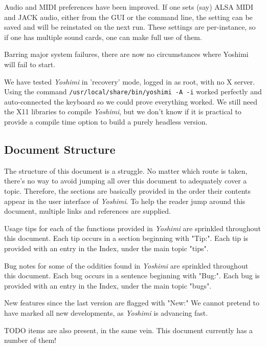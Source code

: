 \documentclass[
 11pt,
 twoside,
 a4paper,
 final                                 %
]{article}
\begin{document}
   Audio and MIDI preferences have been improved. If one sets (say) ALSA MIDI
   and JACK audio, either from the GUI or the command line, the setting can be
   saved and will be reinstated on the next run. These settings are
   per-instance, so if one has multiple sound cards, one can make full use of
   them.

   Barring major system failures, there are now no circumstances where Yoshimi
   will fail to start.

   We have tested \textsl{Yoshimi} in 'recovery' mode, logged in as root, with
   no X server. Using the command \texttt{/usr/local/share/bin/yoshimi -A -i}
   worked perfectly and auto-connected the keyboard so we could prove
   everything worked.  We still need the X11 libraries to compile
   \textsl{Yoshimi}, but we don't know if it is practical to provide a compile
   time option to build a purely headless version.

\subsection{Document Structure}
\label{subsec:introduction_document_structure}

   The structure of this document is a struggle.  No matter which route is
   taken, there's no way to avoid jumping all over this document to
   adequately cover a topic.  Therefore, the sections are basically provided
   in the order their contents appear in the user interface of
   \textsl{Yoshimi}.  To help the reader jump around this document, multiple
   links and references are supplied.

   Usage tips
   for each of the functions provided in
   \textsl{Yoshimi} are sprinkled throughout this document.
   Each tip occurs in a section beginning with "Tip:".
   Each tip is provided with an entry in the Index, under the
   main topic "tips".

   Bug notes
   for some of the oddities found in \textsl{Yoshimi} are
   sprinkled throughout this document.
   Each bug occurs in a sentence beginning with "Bug:".
   Each bug is provided with an entry in the Index, under the
   main topic "bugs".

   New features
   since the last version are flagged with "New:"  We cannot pretend to have
   marked all new developments, as \textsl{Yoshimi} is advancing fast.

   TODO items are also present, in the same vein.  This document currently has
   a number of them!
\end{document}
